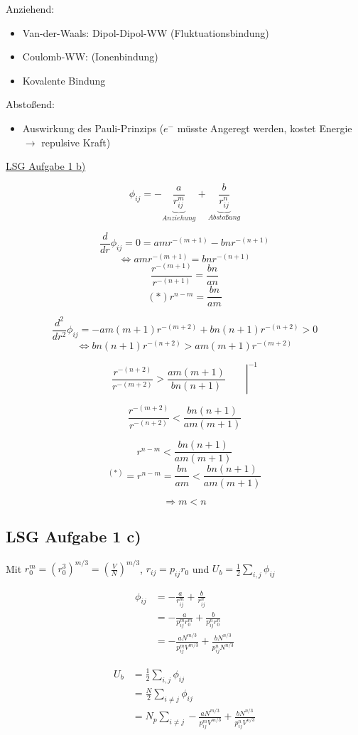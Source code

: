 Anziehend:
\begin{itemize}
\item Van-der-Waals: Dipol-Dipol-WW (Fluktuationsbindung)
\item Coulomb-WW: (Ionenbindung)
\item Kovalente Bindung
\end{itemize}

Abstoßend:
\begin{itemize}
\item Auswirkung des Pauli-Prinzips ($e^-$ müsste Angeregt werden, kostet Energie $\rightarrow$ repulsive Kraft)
\end{itemize}

\underline{LSG Aufgabe 1 b)}

$$\phi_{ij}=-\underbrace{\frac{a}{r^m_{ij}}}_{Anziehung}+\underbrace{\frac{b}{r^n_{ij}}}_{Abstoßung}$$


$$\frac{d}{dr}\phi_{ij}=0=amr^{-(m+1)}-bnr^{-(n+1)}$$
$$\Leftrightarrow amr^{-(m+1)}=bnr^{-(n+1)}$$
$$\frac{r^{-(m+1)}}{r^{-(n+1)}}=\frac{bn}{an} $$
$$(*)r^{n-m}=\frac{bn}{am}$$ 

$$\frac{d^2}{dr^2}\phi_{ij}=-am(m+1)r^{-(m+2)}+bn(n+1)r^{-(n+2)}>0$$
$$\Leftrightarrow bn(n+1)r^{-(n+2)}>am(m+1)r^{-(m+2)}$$

$$\left. \frac{r^{-(n+2)}}{r^{-(m+2)}}  > \frac{am(m+1)}{bn(n+1)}\qquad \right|^{-1}$$

$$\frac{r^{-(m+2)}}{r^{-(n+2)}}  < \frac{bn(n+1)}{am(m+1)}$$

$$r^{n-m} < \frac{bn(n+1)}{am(m+1)}$$
$$^{(*)}= r^{n-m}= \frac{bn}{am} < \frac{bn(n+1)}{am(m+1)}$$

$$ \Rightarrow m<n $$



\subsection*{LSG Aufgabe 1 c)}

Mit $r^m_0=(r^3_0)^{m/3}=(\frac{V}{N})^{m/3}$, $r_{ij} = p_{ij} r_0$ und $U_b=\frac{1}{2}\sum_{i,j}\phi_{ij}$

\begin{align}
\phi_{ij}&=-\frac{a}{r^m_{ij}}+\frac{b}{r^n_{ij}} \\
&=-\frac{a}{p^m_{ij}r^m_0}+\frac{b}{p^n_{ij}r^n_0} \\
&=-\frac{aN^{m/3}}{p^m_{ij}V^{m/3}}+\frac{bN^{n/3}}{p^n_{ij}N^{n/3}} 
\end{align}

\begin{align}
U_b&=\frac{1}{2}\sum_{i,j}\phi_{ij}\\
&=\frac{N}{2}\sum_{i\neq j}\phi_{ij}\\
&=N_p\sum_{i\neq j}-\frac{aN^{m/3}}{p^m_{ij}V^{m/3}}+\frac{bN^{n/3}}{p^n_{ij}V^{n/3}} \\
\end{align}

